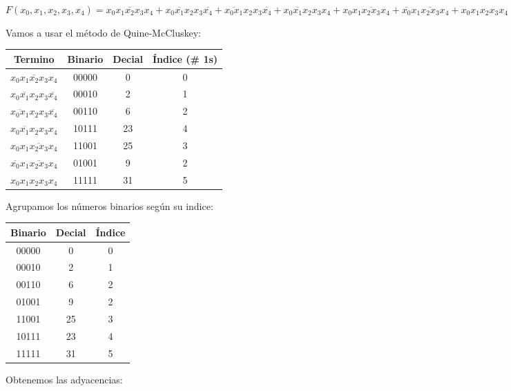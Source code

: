 \documentclass[a4paper,12pt]{article}
\begin{document}
\begin{enumerate}[label=\textcolor{teal}{\textbf{\arabic*.}}]
    \begin{center}
        $F(x_0,x_1,x_2,x_3,x_4) = 
        \overline{x_0 x_1 x_2 x_3 x_4} 
        + \overline{x_0 x_1 x_2} x_3 \overline{x_4} 
        + \overline{x_0 x_1} x_2 x_3 \overline{x_4} 
        + x_0 \overline{x_1} x_2 x_3 x_4
        + x_0 x_1 \overline{x_2 x_3} x_4
        + \overline{x_0} x_1 \overline{x_2 x_3} x_4
        + x_0 x_1 x_2 x_3 x_4 
        $
    \end{center}
    Vamos a usar el método de Quine-McCluskey:\\
    \begin{table} [H]
        \centering
        \begin{tabular}{|c|c|c|c|}
            \hline
            Termino & Binario & Decial & Índice (\# 1s)\\ \hline
            $\overline{x_0 x_1 x_2 x_3 x_4}$  & 00000 & 0 & 0 \\ \hline
            $\overline{x_0 x_1 x_2} x_3 \overline{x_4}$  & 00010 & 2 & 1 \\ \hline  
            $\overline{x_0 x_1} x_2 x_3 \overline{x_4}$  & 00110 & 6 & 2 \\ \hline  
            $x_0 \overline{x_1} x_2 x_3 x_4$  & 10111 & 23 & 4 \\ \hline  
            $x_0 x_1 \overline{x_2 x_3} x_4$  & 11001 & 25 & 3 \\ \hline  
            $\overline{x_0} x_1 \overline{x_2 x_3} x_4$  & 01001 & 9 & 2 \\ \hline  
            $x_0 x_1 x_2 x_3 x_4$  & 11111 & 31 & 5 \\ \hline  
        \end{tabular}
    \end{table}
    Agrupamos los números binarios según su indice:\\
    \begin{table} [H]
        \centering
        \begin{tabular}{|c|c|c|}
            \hline
            Binario & Decial & Índice\\ \hline
            00000 & 0 & 0 \\ \hline
            00010 & 2 & 1 \\ \hline  
            00110 & 6 & 2 \\ \hline 
            01001 & 9 & 2 \\ \hline
            11001 & 25 & 3 \\ \hline    
            10111 & 23 & 4 \\ \hline  
            11111 & 31 & 5 \\ \hline  
        \end{tabular}
    \end{table}
    Obtenemos las adyacencias: \\


\end{enumerate}
\end{document}
